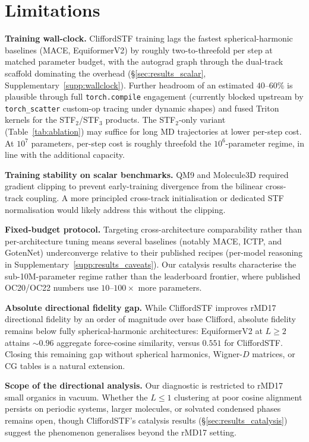 \section{Limitations}\label{sec:limitations}

\textbf{Training wall-clock.} CliffordSTF training lags the fastest spherical-harmonic baselines (MACE, EquiformerV2) by roughly two-to-threefold per step at matched parameter budget, with the autograd graph through the dual-track scaffold dominating the overhead (\S\ref{sec:results_scalar}, Supplementary~\ref{supp:wallclock}). Further headroom of an estimated $40$--$60\%$ is plausible through full \texttt{torch.compile} engagement (currently blocked upstream by \texttt{torch\_scatter} custom-op tracing under dynamic shapes) and fused Triton kernels for the STF$_2$/STF$_3$ products. The STF$_2$-only variant (Table~\ref{tab:ablation}) may suffice for long MD trajectories at lower per-step cost. At $10^7$ parameters, per-step cost is roughly threefold the $10^6$-parameter regime, in line with the additional capacity.

\textbf{Training stability on scalar benchmarks.} QM9 and Molecule3D required gradient clipping to prevent early-training divergence from the bilinear cross-track coupling. A more principled cross-track initialisation or dedicated STF normalisation would likely address this without the clipping.

\textbf{Fixed-budget protocol.} Targeting cross-architecture comparability rather than per-architecture tuning means several baselines (notably MACE, ICTP, and GotenNet) underconverge relative to their published recipes (per-model reasoning in Supplementary~\ref{supp:results_caveats}). Our catalysis results characterise the sub-10M-parameter regime rather than the leaderboard frontier, where published OC20/OC22 numbers use $10$--$100\times$ more parameters.

\textbf{Absolute directional fidelity gap.} While CliffordSTF improves rMD17 directional fidelity by an order of magnitude over base Clifford, absolute fidelity remains below fully spherical-harmonic architectures: EquiformerV2 at $L\!\geq\!2$ attains $\sim\!0.96$ aggregate force-cosine similarity, versus $0.551$ for CliffordSTF. Closing this remaining gap without spherical harmonics, Wigner-$D$ matrices, or CG tables is a natural extension.

\textbf{Scope of the directional analysis.} Our diagnostic is restricted to rMD17 small organics in vacuum. Whether the $L\!\leq\!1$ clustering at poor cosine alignment persists on periodic systems, larger molecules, or solvated condensed phases remains open, though CliffordSTF's catalysis results (\S\ref{sec:results_catalysis}) suggest the phenomenon generalises beyond the rMD17 setting.

